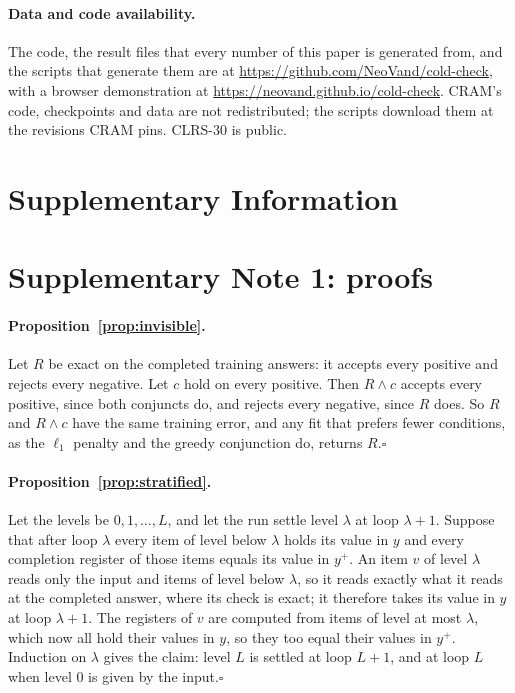\documentclass[10pt]{article}
\begin{document}
\paragraph{Data and code availability.} The code, the result files that every number of this paper is generated from,
and the scripts that generate them are at \url{https://github.com/NeoVand/cold-check}, with a browser demonstration at
\url{https://neovand.github.io/cold-check}. CRAM's code, checkpoints and data are not redistributed; the scripts download
them at the revisions CRAM pins. CLRS-30 is public\cite{velickovic2022clrs}.

\clearpage
\section*{Supplementary Information}
\section*{Supplementary Note 1: proofs}

\paragraph{Proposition~\ref{prop:invisible}.} Let $R$ be exact on the completed training answers: it accepts every
positive and rejects every negative. Let $c$ hold on every positive. Then $R\wedge c$ accepts every positive, since both
conjuncts do, and rejects every negative, since $R$ does. So $R$ and $R \wedge c$ have the same training error, and
any fit that prefers fewer conditions, as the $\ell_1$ penalty and the greedy conjunction do, returns $R$.\hfill$\square$

\paragraph{Proposition~\ref{prop:stratified}.} Let the levels be $0, 1, \ldots, L$, and let the run settle level $\lambda$
at loop $\lambda + 1$. Suppose that after loop $\lambda$ every item of level below $\lambda$ holds its value in $y$ and
every completion register of those items equals its value in $y^{+}$. An item $v$ of level $\lambda$ reads only the input
and items of level below $\lambda$, so it reads exactly what it reads at the completed answer, where its check is exact;
it therefore takes its value in $y$ at loop $\lambda+1$. The registers of $v$ are computed from items of level at most
$\lambda$, which now all hold their values in $y$, so they too equal their values in $y^{+}$. Induction on $\lambda$
gives the claim: level $L$ is settled at loop $L+1$, and at loop $L$ when level $0$ is given by the input.\hfill$\square$
\end{document}
